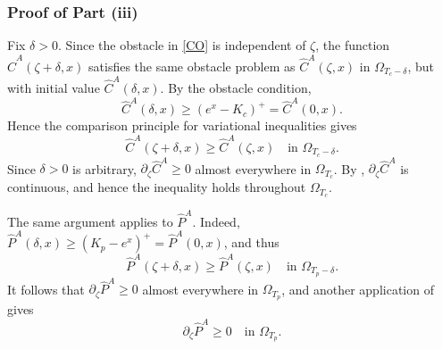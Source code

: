\documentclass[11pt, a4paper, leqno]{amsart}
\numberwithin{equation}{section}
\theoremstyle{plain}
\theoremstyle{definition}
\theoremstyle{remark}
\def\geq{\geqslant}
\begin{document}
{
\subsubsection*{Proof of Part (iii)}

Fix $\delta>0$. Since the obstacle in \eqref{CO} is independent of
$\zeta$, the function $\widehat{C}^A(\zeta+\delta,x)$ satisfies the
same obstacle problem as $\widehat{C}^A(\zeta,x)$ in
$\Omega_{T_c-\delta}$, but with initial value
$\widehat{C}^A(\delta,x)$. By the obstacle condition,
\[
    \widehat{C}^A(\delta,x)
    \geq(e^x-K_c)^+
    =\widehat{C}^A(0,x).
\]
Hence the comparison principle for variational inequalities \cite[Theorem 1.2]{YY08} gives
\[
    \widehat{C}^A(\zeta+\delta,x)
    \geq\widehat{C}^A(\zeta,x)
    \quad\text{in }\Omega_{T_c-\delta}.
\]
Since $\delta>0$ is arbitrary,
$\partial_\zeta\widehat{C}^A\geq0$ almost everywhere in
$\Omega_{T_c}$. By \cite[Theorem 1.2]{Blanchet2006-1},
$\partial_\zeta\widehat{C}^A$ is continuous, and hence the inequality
holds throughout $\Omega_{T_c}$.

The same argument applies to $\widehat{P}^A$. Indeed,
$\widehat{P}^A(\delta,x)\geq(K_p-e^x)^+=\widehat{P}^A(0,x)$, and thus
\[
    \widehat{P}^A(\zeta+\delta,x)
    \geq\widehat{P}^A(\zeta,x)
    \quad\text{in }\Omega_{T_p-\delta}.
\]
It follows that $\partial_\zeta\widehat{P}^A\geq0$ almost everywhere
in $\Omega_{T_p}$, and another application of
\cite[Theorem 1.2]{Blanchet2006-1} gives
\[
    \partial_\zeta\widehat{P}^A\geq0
    \quad\text{in }\Omega_{T_p}.
\]
}
\end{document}
